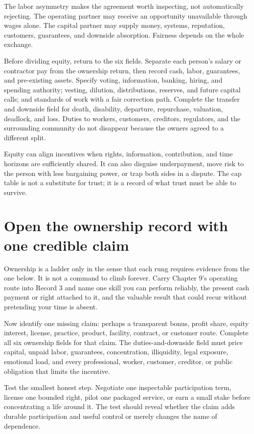 The labor asymmetry makes the agreement worth inspecting, not automatically
rejecting. The operating partner may receive an opportunity unavailable through
wages alone. The capital partner may supply money, systems, reputation,
customers, guarantees, and downside absorption. Fairness depends on the whole
exchange.

Before dividing equity, return to the six fields. Separate each person's salary
or contractor pay from the ownership return, then record cash, labor,
guarantees, and pre-existing assets. Specify voting, information, banking,
hiring, and spending authority; vesting, dilution, distributions, reserves,
and future capital calls; and standards of work with a fair correction path.
Complete the transfer and downside field for death, disability, departure,
repurchase, valuation, deadlock, and loss. Duties to workers, customers,
creditors, regulators, and the surrounding community do not disappear because
the owners agreed to a different split.

Equity can align incentives when rights, information, contribution, and time
horizons are sufficiently shared. It can also disguise underpayment, move risk
to the person with less bargaining power, or trap both sides in a dispute. The
cap table is not a substitute for trust; it is a record of what trust must be
able to survive.

\section{Open the ownership record with one credible claim}

Ownership is a ladder only in the sense that each rung requires evidence from
the one below. It is not a command to climb forever. Carry Chapter 9's operating
route into Record 3 and name one skill you can perform reliably, the present
cash payment or right attached to it, and the valuable result that could recur
without pretending your time is absent.

Now identify one missing claim: perhaps a transparent bonus, profit share,
equity interest, license, practice, product, facility, contract, or customer
route. Complete all six ownership fields for that claim. The duties-and-downside
field must price capital, unpaid labor, guarantees, concentration, illiquidity,
legal exposure, emotional load, and every professional, worker, customer,
creditor, or public obligation that limits the incentive.

Test the smallest honest step. Negotiate one inspectable participation term,
license one bounded right, pilot one packaged service, or earn a small stake
before concentrating a life around it. The test should reveal whether the
claim adds durable participation and useful control or merely changes the name
of dependence.

